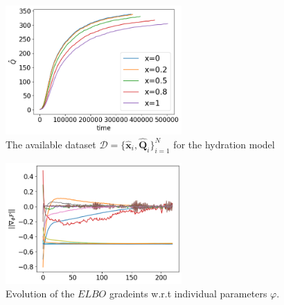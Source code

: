 \documentclass[a4paper,11pt]{article}
\begin{document}
\begin{figure}[!htpb]
    \centering
    \includegraphics[width=0.6\textwidth]{fig/hydration_model_different_x_01_10_2022_17:13pdf.png}
    \caption{The available dataset $\mathcal{D} = \{\bm{\hat{x}}_{i},\bm{\hat{Q}}_{i}\}_{i=1}^{N}$ for the hydration model}
    \label{fig:hydration_datset}
\end{figure}

\begin{figure}[!htpb]
    \centering
    \includegraphics[width=0.6\textwidth]{fig/gradients_01_10_2022_17:13pdf.png}
    \caption{Evolution of the $ELBO$ gradeints w.r.t individual parameters $\varphi$.}
    \label{fig:ELBO_grad_evolution}
\end{figure}
\end{document}
